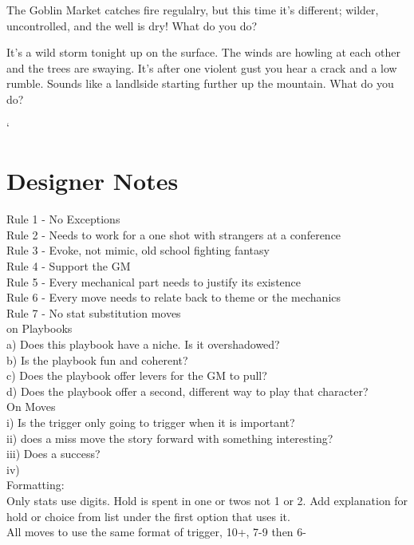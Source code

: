 \documentclass{tufte-book}
\newcommand{\mylist}{\tikz[overlay]\draw(-.2,-.2)--(-.2,.4) [path fading=east](-.2,.15)--(.1,.15);} %
\newcommand{\mylistend}{\tikz[overlay]\draw(-.2,.15)--(-.2,.4) [path fading=east](-.2,.15)--(.1,.15);} %
\newcommand{\myitem}{\item[\mylist]} %
\newcommand{\myitemend}{\item[\mylistend]} %
\begin{document}
The Goblin Market catches fire regulalry, but this time it's different; wilder, uncontrolled, and the well is dry! What do you do?

It's a wild storm tonight up on the surface. The winds are howling at each other and the trees are swaying. It's after one violent gust you hear a crack and a low rumble. Sounds like a landlside starting further up the mountain. What do you do?

 


`



\chapter{Designer Notes}

Rule 1 - No Exceptions\\
Rule 2 - Needs to work for a one shot with strangers at a conference\\
Rule 3 - Evoke, not mimic, old school fighting fantasy\\
Rule 4 - Support the GM\\
Rule 5 - Every mechanical part needs to justify its existence\\
Rule 6 - Every move needs to relate back to theme or the mechanics\\
Rule 7 - No stat substitution moves\\

on Playbooks\\
a) Does this playbook have a niche. Is it overshadowed?\\
b) Is the playbook fun and coherent?\\
c) Does the playbook offer levers for the GM to pull?\\
d) Does the playbook offer a second, different way to play that character?\\

On Moves\\
i) Is the trigger only going to trigger when it is important?\\
ii) does a miss move the story forward with something interesting?\\
iii) Does a success?\\
iv) \\

Formatting:\\
Only stats use digits. Hold is spent in one or twos not 1 or 2. Add explanation for hold or choice from list under the first option that uses it.\\
All moves to use the same format of trigger, 10+, 7-9 then 6-\\









\backmatter




\printindex[stuff]

\printindex
\end{document}

